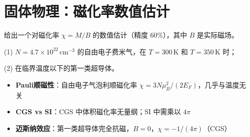 \section{固体物理：磁化率数值估计}
\label{sec:susceptibility-estimate}

\begin{modelbox}[题目：自由电子气与超导体的磁化率]
给出一个对磁化率 $\chi=M/B$ 的数值估计（精度 $60\%$），其中 $B$ 是实际磁场。

(1) $N=4.7\times10^{22}\,\text{cm}^{-3}$ 的自由电子费米气，在 $T=300\,\text{K}$ 和 $T=350\,\text{K}$ 时；

(2) 在临界温度以下的第一类超导体。
\end{modelbox}

\begin{tipbox}[考点快速分析]
\begin{itemize}
    \item \textbf{Pauli顺磁性}：自由电子气泡利顺磁化率 $\chi=3N\mu_B^2/(2E_F)$，几乎与温度无关
    \item \textbf{CGS vs SI}：CGS 中体积磁化率无量纲；SI 中需乘以 $4\pi$
    \item \textbf{迈斯纳效应}：第一类超导体完全抗磁，$B=0$，$\chi=-1/(4\pi)$（CGS）
\end{itemize}
\end{tipbox}

